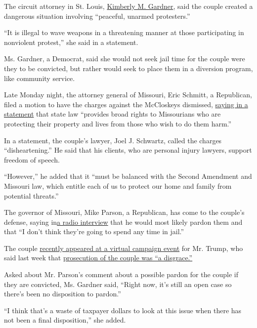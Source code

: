 The circuit attorney in St. Louis,
\href{http://www.circuitattorney.org/OfficeOverview.aspx}{Kimberly M.
Gardner}, said the couple created a dangerous situation involving
``peaceful, unarmed protesters.''

``It is illegal to wave weapons in a threatening manner at those
participating in nonviolent protest,'' she said in a statement.

Ms. Gardner, a Democrat, said she would not seek jail time for the
couple were they to be convicted, but rather would seek to place them in
a diversion program, like community service.

Late Monday night, the attorney general of Missouri, Eric Schmitt, a
Republican, filed a motion to have the charges against the McCloskeys
dismissed,
\href{https://ago.mo.gov/home/news/2020/07/20/attorney-general-schmitt-files-brief-defending-missourians-second-amendment-rights}{saying
in a statement} that state law ``provides broad rights to Missourians
who are protecting their property and lives from those who wish to do
them harm.''

In a statement, the couple's lawyer, Joel J. Schwartz, called the
charges ``disheartening.'' He said that his clients, who are personal
injury lawyers, support freedom of speech.

``However,'' he added that it ``must be balanced with the Second
Amendment and Missouri law, which entitle each of us to protect our home
and family from potential threats.''

The governor of Missouri, Mike Parson, a Republican, has come to the
couple's defense, saying
in\href{https://www.kmov.com/news/gov-parson-says-pardon-likely-if-st-louis-couple-charged/article_5ecedf8a-236e-50dd-a83c-a012a0b4079b.html}{a
radio interview} that he would most likely pardon them and that ``I
don't think they're going to spend any time in jail.''

The couple
\href{https://www.cbsnews.com/news/mark-patricia-mccloskey-guns-kimberly-guilfoyle-interview-trump-camapign/}{recently
appeared at a virtual campaign event} for Mr. Trump, who said last week
that \href{https://youtu.be/70Jzf0NhBv8?t=21}{prosecution of the couple
was ``a disgrace.''}

Asked about Mr. Parson's comment about a possible pardon for the couple
if they are convicted, Ms. Gardner said, ``Right now, it's still an open
case so there's been no disposition to pardon.''

``I think that's a waste of taxpayer dollars to look at this issue when
there has not been a final disposition,'' she added.

